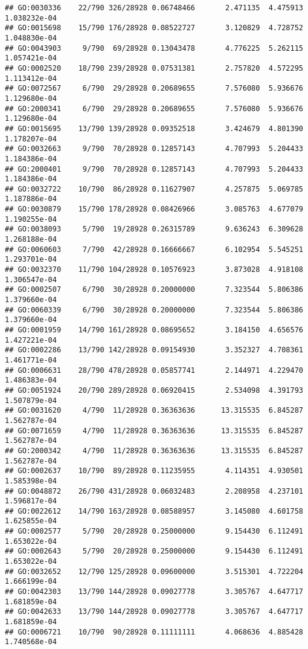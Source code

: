 \documentclass[
]{article}
\begin{document}
\begin{verbatim}
## GO:0030336    22/790 326/28928 0.06748466       2.471135  4.475913 1.038232e-04
## GO:0015698    15/790 176/28928 0.08522727       3.120829  4.728752 1.048830e-04
## GO:0043903     9/790  69/28928 0.13043478       4.776225  5.262115 1.057421e-04
## GO:0002520    18/790 239/28928 0.07531381       2.757820  4.572295 1.113412e-04
## GO:0072567     6/790  29/28928 0.20689655       7.576080  5.936676 1.129680e-04
## GO:2000341     6/790  29/28928 0.20689655       7.576080  5.936676 1.129680e-04
## GO:0015695    13/790 139/28928 0.09352518       3.424679  4.801390 1.178207e-04
## GO:0032663     9/790  70/28928 0.12857143       4.707993  5.204433 1.184386e-04
## GO:2000401     9/790  70/28928 0.12857143       4.707993  5.204433 1.184386e-04
## GO:0032722    10/790  86/28928 0.11627907       4.257875  5.069785 1.187886e-04
## GO:0030879    15/790 178/28928 0.08426966       3.085763  4.677079 1.190255e-04
## GO:0038093     5/790  19/28928 0.26315789       9.636243  6.309628 1.268188e-04
## GO:0060603     7/790  42/28928 0.16666667       6.102954  5.545251 1.293701e-04
## GO:0032370    11/790 104/28928 0.10576923       3.873028  4.918108 1.306547e-04
## GO:0002507     6/790  30/28928 0.20000000       7.323544  5.806386 1.379660e-04
## GO:0060339     6/790  30/28928 0.20000000       7.323544  5.806386 1.379660e-04
## GO:0001959    14/790 161/28928 0.08695652       3.184150  4.656576 1.427221e-04
## GO:0002286    13/790 142/28928 0.09154930       3.352327  4.708361 1.461771e-04
## GO:0006631    28/790 478/28928 0.05857741       2.144971  4.229470 1.486383e-04
## GO:0051924    20/790 289/28928 0.06920415       2.534098  4.391793 1.507879e-04
## GO:0031620     4/790  11/28928 0.36363636      13.315535  6.845287 1.562787e-04
## GO:0071659     4/790  11/28928 0.36363636      13.315535  6.845287 1.562787e-04
## GO:2000342     4/790  11/28928 0.36363636      13.315535  6.845287 1.562787e-04
## GO:0002637    10/790  89/28928 0.11235955       4.114351  4.930501 1.585398e-04
## GO:0048872    26/790 431/28928 0.06032483       2.208958  4.237101 1.596817e-04
## GO:0022612    14/790 163/28928 0.08588957       3.145080  4.601758 1.625855e-04
## GO:0002577     5/790  20/28928 0.25000000       9.154430  6.112491 1.653022e-04
## GO:0002643     5/790  20/28928 0.25000000       9.154430  6.112491 1.653022e-04
## GO:0032652    12/790 125/28928 0.09600000       3.515301  4.722204 1.666199e-04
## GO:0042303    13/790 144/28928 0.09027778       3.305767  4.647717 1.681859e-04
## GO:0042633    13/790 144/28928 0.09027778       3.305767  4.647717 1.681859e-04
## GO:0006721    10/790  90/28928 0.11111111       4.068636  4.885428 1.740568e-04

\end{verbatim}
\end{document}
